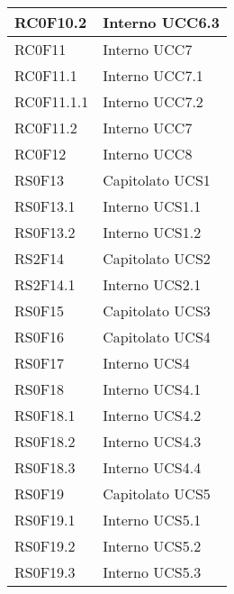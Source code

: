\begin{center}
\begin{longtable}{|p{5cm}|p{5cm}|}
RC0F10.2	& Interno \newline UCC6.3 \\\hline
RC0F11		& Interno \newline UCC7 \\\hline
RC0F11.1	& Interno \newline UCC7.1 \\\hline
RC0F11.1.1	& Interno \newline UCC7.2 \\\hline
RC0F11.2	& Interno \newline UCC7 \\\hline
RC0F12		& Interno \newline UCC8 \\\hline
RS0F13		& Capitolato \newline UCS1 \\\hline
RS0F13.1	& Interno \newline UCS1.1 \\\hline
RS0F13.2	& Interno \newline UCS1.2 \\\hline
RS2F14		& Capitolato \newline UCS2 \\\hline
RS2F14.1	& Interno \newline UCS2.1 \\\hline
RS0F15		& Capitolato \newline UCS3 \\\hline
RS0F16		& Capitolato \newline UCS4 \\\hline
RS0F17		& Interno \newline UCS4 \\\hline
RS0F18		& Interno \newline UCS4.1 \\\hline
RS0F18.1	& Interno \newline UCS4.2 \\\hline
RS0F18.2	& Interno \newline UCS4.3 \\\hline
RS0F18.3	& Interno \newline UCS4.4 \\\hline
RS0F19		& Capitolato \newline UCS5 \\\hline
RS0F19.1	& Interno \newline UCS5.1 \\\hline
RS0F19.2	& Interno \newline UCS5.2 \\\hline
RS0F19.3	& Interno \newline UCS5.3 \\\hline

\end{longtable}
\end{center}
